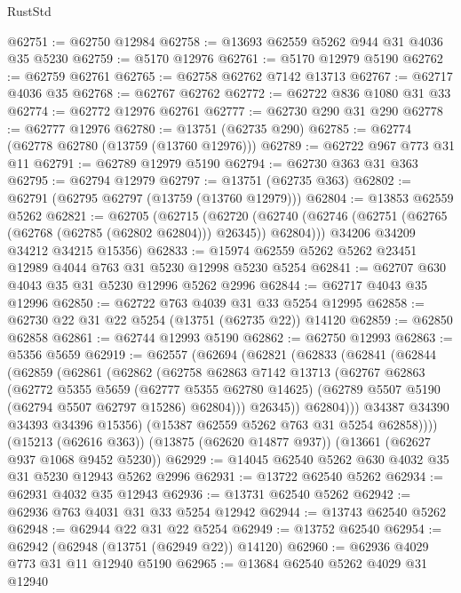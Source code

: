 \begin{lexlean}{RustStd}
\begin{coremodule}
@62751 := @62750 @12984
@62758 := @13693 @62559 @5262 @944 @31 @4036 @35 @5230
@62759 := @5170 @12976
@62761 := @5170 @12979 @5190
@62762 := @62759 @62761
@62765 := @62758 @62762 @7142 @13713
@62767 := @62717 @4036 @35
@62768 := @62767 @62762
@62772 := @62722 @836 @1080 @31 @33
@62774 := @62772 @12976 @62761
@62777 := @62730 @290 @31 @290
@62778 := @62777 @12976
@62780 := @13751 (@62735 @290)
@62785 := @62774 (@62778 @62780 (@13759 (@13760 @12976)))
@62789 := @62722 @967 @773 @31 @11
@62791 := @62789 @12979 @5190
@62794 := @62730 @363 @31 @363
@62795 := @62794 @12979
@62797 := @13751 (@62735 @363)
@62802 := @62791 (@62795 @62797 (@13759 (@13760 @12979)))
@62804 := @13853 @62559 @5262
@62821 := @62705
    (@62715
      (@62720 (@62740 (@62746 (@62751 (@62765 (@62768 (@62785 (@62802 @62804))) @26345)) @62804)))
      @34206
      @34209
      @34212
      @34215
      @15356)
@62833 := @15974 @62559 @5262 @5262 @23451 @12989 @4044 @763 @31 @5230 @12998 @5230 @5254
@62841 := @62707 @630 @4043 @35 @31 @5230 @12996 @5262 @2996
@62844 := @62717 @4043 @35 @12996
@62850 := @62722 @763 @4039 @31 @33 @5254 @12995
@62858 := @62730 @22 @31 @22 @5254 (@13751 (@62735 @22)) @14120
@62859 := @62850 @62858
@62861 := @62744 @12993 @5190
@62862 := @62750 @12993
@62863 := @5356 @5659
@62919 := @62557
    (@62694
      (@62821
        (@62833
          (@62841
            (@62844
              (@62859
                (@62861
                  (@62862
                    (@62758
                      @62863
                      @7142
                      @13713
                      (@62767
                        @62863
                        (@62772
                          @5355
                          @5659
                          (@62777 @5355 @62780 @14625)
                          (@62789 @5507 @5190 (@62794 @5507 @62797 @15286) @62804)))
                      @26345))
                  @62804)))
            @34387
            @34390
            @34393
            @34396
            @15356)
          (@15387 @62559 @5262 @763 @31 @5254 @62858))))
    (@15213 (@62616 @363))
    (@13875 (@62620 @14877 @937))
    (@13661 (@62627 @937 @1068 @9452 @5230))
@62929 := @14045 @62540 @5262 @630 @4032 @35 @31 @5230 @12943 @5262 @2996
@62931 := @13722 @62540 @5262
@62934 := @62931 @4032 @35 @12943
@62936 := @13731 @62540 @5262
@62942 := @62936 @763 @4031 @31 @33 @5254 @12942
@62944 := @13743 @62540 @5262
@62948 := @62944 @22 @31 @22 @5254
@62949 := @13752 @62540
@62954 := @62942 (@62948 (@13751 (@62949 @22)) @14120)
@62960 := @62936 @4029 @773 @31 @11 @12940 @5190
@62965 := @13684 @62540 @5262 @4029 @31 @12940

\end{coremodule}
\end{lexlean}
